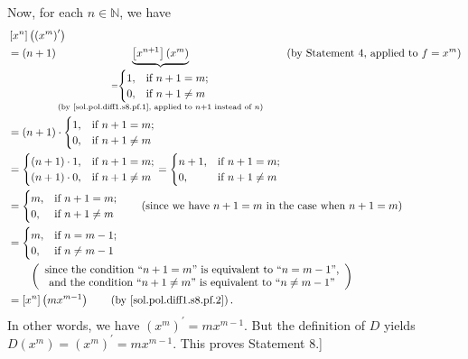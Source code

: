 \documentclass[paper=a4, fontsize=12pt]{scrartcl}%
\theoremstyle{plainsl}
\theoremstyle{definition}
\theoremstyle{remark}
\begin{document}
Now, for each $n\in\mathbb{N}$, we have%
\begin{align*}
&  \left[  x^{n}\right]  \left(  \left(  x^{m}\right)  ^{\prime}\right) \\
&  =\left(  n+1\right)  \underbrace{\left[  x^{n+1}\right]  \left(
x^{m}\right)  }_{\substack{=%
\begin{cases}
1, & \text{if }n+1=m;\\
0, & \text{if }n+1\neq m
\end{cases}
\\\text{(by \eqref{sol.pol.diff1.s8.pf.1}, applied to }n+1\text{ instead of
}n\text{)}}}\qquad\left(  \text{by Statement 4, applied to }f=x^{m}\right) \\
&  =\left(  n+1\right)  \cdot%
\begin{cases}
1, & \text{if }n+1=m;\\
0, & \text{if }n+1\neq m
\end{cases}
\\
&  =%
\begin{cases}
\left(  n+1\right)  \cdot1, & \text{if }n+1=m;\\
\left(  n+1\right)  \cdot0, & \text{if }n+1\neq m
\end{cases}
=%
\begin{cases}
n+1, & \text{if }n+1=m;\\
0, & \text{if }n+1\neq m
\end{cases}
\\
&  =%
\begin{cases}
m, & \text{if }n+1=m;\\
0, & \text{if }n+1\neq m
\end{cases}
\qquad\left(  \text{since we have }n+1=m\text{ in the case when }n+1=m\right)
\\
&  =%
\begin{cases}
m, & \text{if }n=m-1;\\
0, & \text{if }n\neq m-1
\end{cases}
\\
&  \qquad\left(
\begin{array}
[c]{c}%
\text{since the condition \textquotedblleft}n+1=m\text{\textquotedblright\ is
equivalent to \textquotedblleft}n=m-1\text{\textquotedblright,}\\
\text{and the condition \textquotedblleft}n+1\neq m\text{\textquotedblright%
\ is equivalent to \textquotedblleft}n\neq m-1\text{\textquotedblright}%
\end{array}
\right) \\
&  =\left[  x^{n}\right]  \left(  mx^{m-1}\right)  \qquad\left(  \text{by
\eqref{sol.pol.diff1.s8.pf.2}}\right)  .
\end{align*}
In other words, we have $\left(  x^{m}\right)  ^{\prime}=mx^{m-1}$. But the
definition of $D$ yields $D\left(  x^{m}\right)  =\left(  x^{m}\right)
^{\prime}=mx^{m-1}$. This proves Statement 8.]
\end{document}
